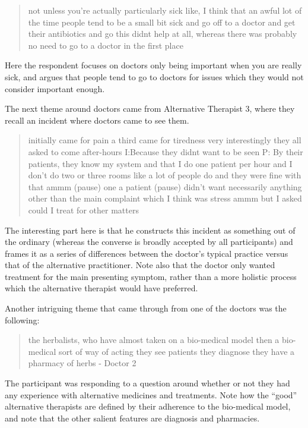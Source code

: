 \begin{quotation}
  not unless you're actually particularly sick like, I think that an awful lot of the time people tend to be a small bit sick and go off to a doctor and get their antibiotics and go this didnt help at all, whereas there was probably no need to go to a doctor in the first place 

\end{quotation}

Here the respondent focuses on doctors only being important when you are really sick, and argues that people tend to go to doctors for issues which they would not consider important enough. 

The next theme around doctors came from Alternative Therapist 3, where they recall an incident where doctors came to see them. 

\begin{quotation}
  initially came for pain a third came for tiredness very interestingly they all asked to come after-hours 
I:Because they didnt want to be seen
P: By their patients, they know my system and that I do one patient per hour and I don't do two or three rooms like a lot of people do and they were fine with that ammm (pause) one a patient (pause) didn't want necessarily anything other than the main complaint which I think was stress ammm but I asked could I treat for other matters 

\end{quotation}

The interesting part here is that he constructs this incident as something out of the ordinary (whereas the converse is broadly accepted by all participants) and frames it as a series of differences between the doctor's typical practice versus that of the alternative practitioner. Note also that the doctor only wanted treatment for the main presenting symptom, rather than a more holistic process which the alternative therapist would have preferred. 

Another intriguing theme that came through from one of the doctors was the following: 

\begin{quotation}
  the herbalists, who have almost taken on a bio-medical model then a bio-medical sort of way of acting they see patients they diagnose they have a pharmacy of herbs - Doctor 2

\end{quotation}

The participant was responding to a question around whether or not they had any experience with alternative medicines and treatments. Note how the ``good'' alternative therapists are defined by their adherence to the bio-medical model, and note that the other salient features are diagnosis and pharmacies. 

